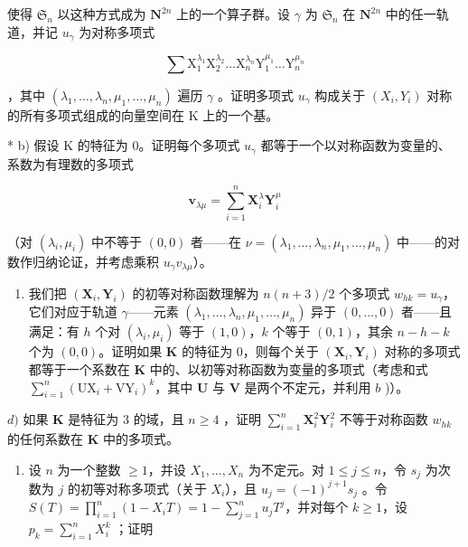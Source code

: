使得 \(\mathfrak{S}_n\) 以这种方式成为 \(\mathbf{N}^{2n}\) 上的一个算子群。设 \(\gamma\) 为 \(\mathfrak{S}_n\) 在 \(\mathbf{N}^{2n}\) 中的任一轨道，并记 \(u_{\gamma}\) 为对称多项式

\[
\sum \mathrm{X} _ {1} ^ {\lambda_ {1}} \mathrm{X} _ {2} ^ {\lambda_ {2}} \dots \mathrm{X} _ {n} ^ {\lambda_ {n}} \mathrm{Y} _ {1} ^ {\mu_ {1}} \dots \mathrm{Y} _ {n} ^ {\mu_ {n}}
\]

，其中 \((\lambda_{1},\ldots,\lambda_{n},\mu_{1},\ldots,\mu_{n})\) 遍历 \(\gamma\) 。证明多项式 \(u_{\gamma}\) 构成关于 \((X_{i},Y_{i})\) 对称的所有多项式组成的向量空间在 K 上的一个基。

* b) 假设 K 的特征为 0。证明每个多项式 \(u_{\gamma}\) 都等于一个以对称函数为变量的、系数为有理数的多项式

\[
\boldsymbol {v} _ {\lambda \mu} = \sum_ {i = 1} ^ {n} \mathbf {X} _ {i} ^ {\lambda} \mathbf {Y} _ {i} ^ {\mu}
\]

（对 \((\lambda_i, \mu_i)\) 中不等于 \((0, 0)\) 者——在 \(\nu = (\lambda_1, \ldots, \lambda_n, \mu_1, \ldots, \mu_n)\) 中——的对数作归纳论证，并考虑乘积 \(u_\gamma v_{\lambda \mu}\)）。

\begin{enumerate}
\def\labelenumi{\alph{enumi})}
\setcounter{enumi}{2}
\tightlist
\item
  我们把 \((\mathbf{X}_i, \mathbf{Y}_i)\) 的初等对称函数理解为 \(n(n + 3)/2\) 个多项式 \(w_{hk} = u_\gamma\)，它们对应于轨道 \(\gamma\)——元素 \((\lambda_1, \ldots, \lambda_n, \mu_1, \ldots, \mu_n)\) 异于 \((0, \ldots, 0)\) 者——且满足：有 \(h\) 个对 \((\lambda_i, \mu_i)\) 等于 \((1, 0)\)，\(k\) 个等于 \((0, 1)\)，其余 \(n - h - k\) 个为 \((0, 0)\)。证明如果 \(\mathbf{K}\) 的特征为 0，则每个关于 \((\mathbf{X}_i, \mathbf{Y}_i)\) 对称的多项式都等于一个系数在 \(\mathbf{K}\) 中的、以初等对称函数为变量的多项式（考虑和式 \(\sum_{i=1}^{n} (\mathrm{UX}_i + \mathrm{VY}_i)^k\)，其中 \(\mathbf{U}\) 与 \(\mathbf{V}\) 是两个不定元，并利用 \(b\) )）。
\end{enumerate}

\(d)\) 如果 \(\mathbf{K}\) 是特征为 3 的域，且 \(n \geqslant 4\) ，证明 \(\sum_{i=1}^{n} \mathbf{X}_i^2 \mathbf{Y}_i^2\) 不等于对称函数 \(w_{hk}\) 的任何系数在 \(\mathbf{K}\) 中的多项式。

\begin{enumerate}
\def\labelenumi{\arabic{enumi})}
\setcounter{enumi}{5}
\tightlist
\item
  设 \(n\) 为一个整数 \(\geqslant 1\)，并设 \(X_1, \ldots, X_n\) 为不定元。对 \(1 \leqslant j \leqslant n\)，令 \(s_j\) 为次数为 \(j\) 的初等对称多项式（关于 \(X_i\)），且 \(u_j = (-1)^{j+1} s_j\) 。令 \(S(T) = \prod_{i=1}^{n} (1 - X_i T) = 1 - \sum_{j=1}^{n} u_j T^j\)，并对每个 \(k \geqslant 1\)，设 \(p_k = \sum_{i=1}^{n} X_i^k\) ；证明
\end{enumerate}

